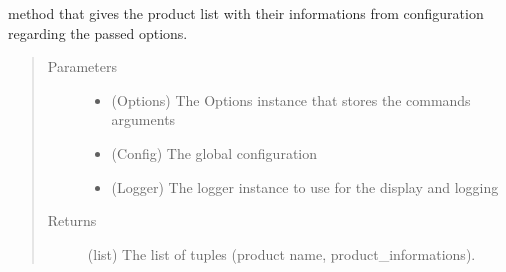\documentclass[a4paper,10pt,english]{sphinxmanual}
\begin{document}

\begin{fulllineitems}
\label{\detokenize{apidoc_commands/commands:commands.make.get_products_list}}
method that gives the product list with their informations from 
configuration regarding the passed options.
\begin{quote}\begin{description}
\item[{Parameters}] \leavevmode\begin{itemize}
\item {} 
 \textendash{} (Options) 
The Options instance that stores the commands arguments

\item {} 
 \textendash{} (Config) The global configuration

\item {} 
 \textendash{} (Logger) 
The logger instance to use for the display and logging

\end{itemize}

\item[{Returns}] \leavevmode
(list) The list of tuples (product name, product\_informations).

\end{description}\end{quote}

\end{fulllineitems}

\end{document}
